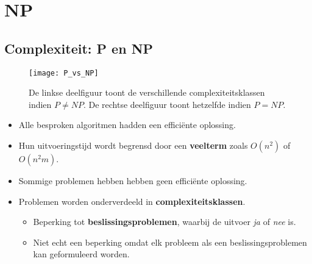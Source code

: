 \chapter{NP}

\section{Complexiteit: P en NP}
\begin{figure}[ht]
    \centering
    \texttt{[image: P\_vs\_NP]}
    \caption{De linkse deelfiguur toont de verschillende complexiteitsklassen indien $P \neq NP$. De rechtse deelfiguur toont hetzelfde indien $P = NP$.}
    \label{fig:P_vs_NP}
\end{figure}

\begin{itemize}
    \item Alle besproken algoritmen hadden een efficiënte oplossing. 
    \item Hun uitvoeringstijd wordt begrensd door een \textbf{veelterm} zoals $O(n^2)$ of $O(n^2m)$.
    \item Sommige problemen hebben hebben geen efficiënte oplossing.
    \item Problemen worden onderverdeeld in \textbf{complexiteitsklassen}.
    \begin{itemize}
        \item Beperking tot  \textbf{beslissingsproblemen}, waarbij de uitvoer \textit{ja} of \textit{nee} is.
        \item Niet echt een beperking omdat elk probleem als een beslissingsproblemen kan geformuleerd worden.
    \end{itemize}
\end{itemize}

